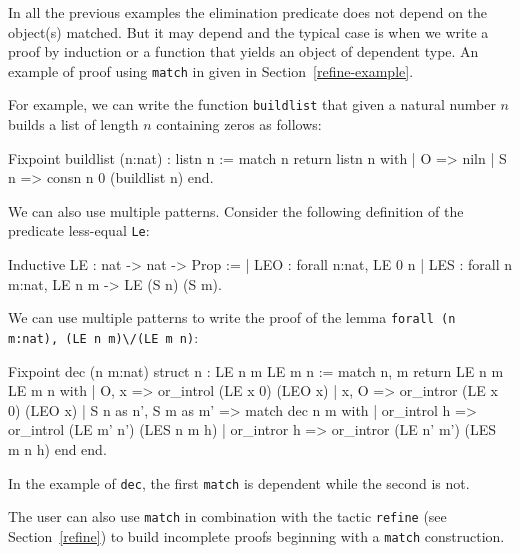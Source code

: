 In all the previous examples the elimination predicate does not depend
on the object(s) matched. But it may depend and the typical case
is when we write a proof by induction or a function that yields an
object of dependent type. An example of proof using \texttt{match} in
given in Section~\ref{refine-example}.

For example, we can write
the function \texttt{buildlist} that given a natural number
$n$ builds a list of length $n$ containing zeros as follows:

\begin{coq_example}
Fixpoint buildlist (n:nat) : listn n :=
  match n return listn n with
  | O => niln
  | S n => consn n 0 (buildlist n)
  end.
\end{coq_example}

We can also use multiple patterns.
Consider the following definition of the predicate less-equal
\texttt{Le}:

\begin{coq_example}
Inductive LE : nat -> nat -> Prop :=
  | LEO : forall n:nat, LE 0 n
  | LES : forall n m:nat, LE n m -> LE (S n) (S m).
\end{coq_example}

We can use multiple patterns to write  the proof of the lemma
 \texttt{forall (n m:nat), (LE n m)}\verb=\/=\texttt{(LE m n)}:

\begin{coq_example}
Fixpoint dec (n m:nat) {struct n} : LE n m \/ LE m n :=
  match n, m return LE n m \/ LE m n with
  | O, x => or_introl (LE x 0) (LEO x)
  | x, O => or_intror (LE x 0) (LEO x)
  | S n as n', S m as m' =>
      match dec n m with
      | or_introl h => or_introl (LE m' n') (LES n m h)
      | or_intror h => or_intror (LE n' m') (LES m n h)
      end
  end.
\end{coq_example}
In the example of \texttt{dec},
the first \texttt{match} is dependent while
the second is not.


The user can also use \texttt{match} in combination with the tactic
\texttt{refine} (see Section~\ref{refine}) to build incomplete proofs
beginning with a \texttt{match} construction.

